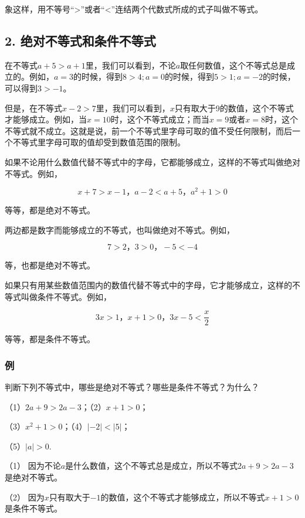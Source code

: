 象这样，用不等号``\textgreater''或者``\textless''连结两个代数式所成的式子叫做不等式。

\subsection{2. 绝对不等式和条件不等式}

在不等式\(a + 5 > a + 1\)里，我们可以看到，不论\(a\)取任何数值，这个不等式总是成立的。例如，\(a = 3\)的时候，得到\(8 > 4; a = 0\)的时候，得到\(5 > 1; a = -2\)的时候，可以得到\(3 > -1\)。

但是，在不等式\(x - 2 > 7\)里，我们可以看到，\(x\)只有取大于9的数值，这个不等式才能够成立。例如，当\(x = 10\)时，这个不等式成立；而当\(x = 9\)或者\(x = 8\)时，这个不等式就不成立。这就是说，前一个不等式里字母可取的值不受任何限制，而后一个不等式里字母可取的值却受到数值范围的限制。

如果不论用什么数值代替不等式中的字母，它都能够成立，这样的不等式叫做绝对不等式。例如，

\[
x + 7 > x - 1\text{，} a - 2 <   a + 5\text{，} a ^ {2} + 1 > 0
\]

等等，都是绝对不等式。

两边都是数字而能够成立的不等式，也叫做绝对不等式。例如，

\[
7 > 2\text{，} 3 > 0\text{，} - 5 <   - 4
\]

等，也都是绝对不等式。

如果只有用某些数值范围内的数值代替不等式中的字母，它才能够成立，这样的不等式叫做条件不等式。例如，

\[
3 x > 1\text{，} x + 1 > 0\text{，} 3 x - 5 <   \frac{x}{2}
\]

等等，都是条件不等式。

\subsubsection{例}

判断下列不等式中，哪些是绝对不等式？哪些是条件不等式？为什么？

（1）\(2a + 9 > 2a - 3\)；（2）\(x + 1 > 0\)；

（3）\(x^{2} + 1 > 0\)；（4）\(|-2| < |5|\)；

（5）\(|a| > 0.\)

 （1）
因为不论\(a\)是什么数值，这个不等式总是成立，所以不等式\(2a + 9 > 2a - 3\)是绝对不等式。

（2）
因为\(x\)只有取大于\(-1\)的数值，这个不等式才能够成立，所以不等式\(x + 1 > 0\)是条件不等式。

